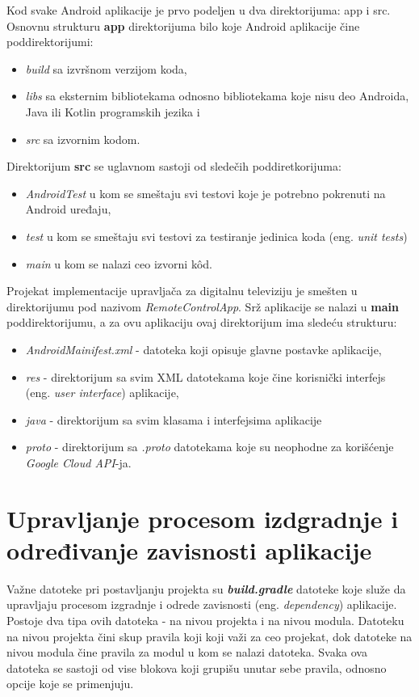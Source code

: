\documentclass[implementacija.tex]{subfiles}
\begin{document}
Kod svake Android aplikacije je prvo podeljen u dva direktorijuma: app i src. Osnovnu strukturu \textbf{app} direktorijuma bilo koje Android aplikacije čine poddirektorijumi: 

\begin{itemize}
\item \textit{build} sa izvršnom verzijom koda,
\item \textit{libs} sa eksternim bibliotekama odnosno bibliotekama koje nisu deo Androida, Java ili Kotlin programskih jezika i
\item \textit{src} sa izvornim kodom.
\end{itemize}

 Direktorijum \textbf{src} se uglavnom sastoji od sledečih poddiretkorijuma: 
\begin{itemize}
\item \textit{AndroidTest} u kom se smeštaju svi testovi koje je potrebno pokrenuti na Android uređaju, 
\item \textit{test} u kom se smeštaju svi testovi za testiranje jedinica koda (eng. \textit{unit tests})
\item \textit{main} u kom se nalazi ceo izvorni k\^{o}d.
\end{itemize}

Projekat implementacije upravljača za digitalnu televiziju je smešten u direktorijumu pod nazivom \textit{RemoteControlApp}. Srž aplikacije se nalazi u \textbf{main} poddirektorijumu, a za ovu aplikaciju ovaj direktorijum ima sledeću strukturu:
\begin{itemize}
\item \textit{AndroidMainifest.xml} - datoteka koji opisuje glavne postavke aplikacije,
\item \textit{res} - direktorijum sa svim XML datotekama koje čine korisnički interfejs (eng. \textit{user interface}) aplikacije,
\item \textit{java} - direktorijum sa svim klasama i interfejsima aplikacije
\item \textit{proto} - direktorijum sa \textit{.proto} datotekama koje su neophodne za korišćenje \textit{Google Cloud API}-ja.
\end{itemize}

\section{Upravljanje procesom izdgradnje i određivanje zavisnosti aplikacije}

Važne datoteke pri postavljanju projekta su \textbf{\textit{build.gradle}} datoteke koje služe da  upravljaju procesom izgradnje i odrede zavisnosti (eng. \textit{dependency}) aplikacije. Postoje dva tipa ovih datoteka - na nivou projekta i na nivou modula. Datoteku na nivou projekta čini skup pravila koji koji važi za ceo projekat, dok datoteke na nivou modula čine pravila za modul u kom se nalazi datoteka. Svaka ova datoteka se sastoji od vise blokova koji grupišu unutar sebe pravila, odnosno opcije koje se primenjuju.
\end{document}
